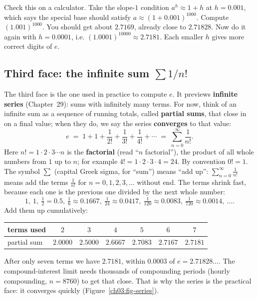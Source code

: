 \begin{labbox}
Check this on a calculator. Take the slope-$1$ condition $a^h\approx 1+h$ at $h=0.001$, which says the special base should satisfy $a \approx (1+0.001)^{1000}$. Compute $(1.001)^{1000}$. You should get about $2.7169$, already close to $2.71828$. Now do it again with $h=0.0001$, i.e. $(1.0001)^{10000}\approx 2.7181$. Each smaller $h$ gives more correct digits of $e$.
\end{labbox}

\subsection{Third face: the infinite sum $\sum 1/n!$}

The third face is the one used in practice to compute $e$. It previews \textbf{infinite series} (Chapter~29): sums with infinitely many terms. For now, think of an infinite sum as a sequence of running totals, called \textbf{partial sums}, that close in on a final value; when they do, we say the series \textbf{converges} to that value:
\[
e \;=\; 1 + 1 + \frac{1}{2!} + \frac{1}{3!} + \frac{1}{4!} + \cdots
   \;=\; \sum_{n=0}^{\infty} \frac{1}{n!}.
\]
Here $n! = 1\cdot 2\cdot 3\cdots n$ is the \textbf{factorial} (read ``$n$ factorial''), the product of all whole numbers from $1$ up to $n$; for example $4!=1\cdot2\cdot3\cdot4=24$. By convention $0!=1$. The symbol $\sum$ (capital Greek sigma, for ``sum'') means ``add up'': $\sum_{n=0}^{\infty}\frac{1}{n!}$ means add the terms $\frac{1}{n!}$ for $n=0,1,2,3,\ldots$ without end. The terms shrink fast, because each one is the previous one divided by the next whole number:
\[
1,\ 1,\ \tfrac{1}{2}=0.5,\ \tfrac{1}{6}\approx0.1667,\ \tfrac{1}{24}\approx0.0417,\ \tfrac{1}{120}\approx0.0083,\ \tfrac{1}{720}\approx0.0014,\ \ldots.
\]
Add them up cumulatively:
\begin{center}
\begin{tabular}{@{}lcccccc@{}}
\toprule
terms used & $2$ & $3$ & $4$ & $5$ & $6$ & $7$ \\
\midrule
partial sum & $2.0000$ & $2.5000$ & $2.6667$ & $2.7083$ & $2.7167$ & $2.7181$ \\
\bottomrule
\end{tabular}
\end{center}
After only seven terms we have $2.7181$, within $0.0003$ of $e=2.71828\ldots$. The compound-interest limit needs thousands of compounding periods (hourly compounding, $n=8760$) to get that close. That is why the series is the practical face: it converges quickly (Figure~\ref{ch03:fig-series}).

